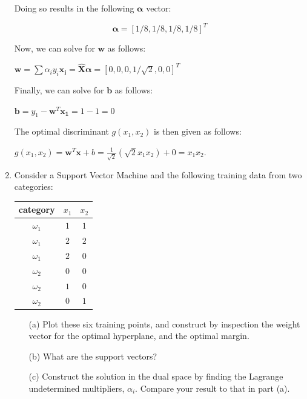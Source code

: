 \documentclass[fleqn]{article}
\begin{document}
\begin{enumerate}
	Doing so results in the following $\boldsymbol{\alpha}$ vector:
	
	\begin{equation*}
		\boldsymbol{\alpha} = [1/8,1/8,1/8,1/8]^T
	\end{equation*}
	
	Now, we can solve for $\mathbf{w}$ as follows:
	
	$\mathbf{w} = \sum{\alpha_iy_i\mathbf{x_i}} = \boldsymbol{\hat{X}}\boldsymbol{\alpha} = [0,0,0,1/\sqrt{2},0,0]^T$
	
	Finally, we can solve for $\mathbf{b}$ as follows:
	
	$\mathbf{b} = y_1 - \mathbf{w}^T\mathbf{x_1} = 1 - 1 = 0$
	
	The optimal discriminant $g(x_1,x_2)$ is then given as follows:
	
	$g(x_1,x_2) = \mathbf{w}^T\mathbf{x} + b = \frac{1}{\sqrt{2}}(\sqrt{2}x_1x_2) + 0 = x_1x_2$.
	
	\item Consider a Support Vector Machine and the following training data from two categories:
	
	\begin{center}
	\begin{tabular}{| c | c | c |}
		\hline
		category & $x_1$ & $x_2$ \\
		\hline
		$\omega_1$ & $1$ & $1$ \\
		$\omega_1$ & $2$ & $2$ \\
		$\omega_1$ & $2$ & $0$ \\
		\hline
		$\omega_2$ & $0$ & $0$ \\
		$\omega_2$ & $1$ & $0$ \\
		$\omega_2$ & $0$ & $1$ \\
		\hline
	\end{tabular}
	\end{center}
	
	\begin{enumerate}
		\item[(a)] Plot these six training points, and construct by inspection the weight vector for the optimal hyperplane, and the optimal margin.
		
		\item[(b)] What are the support vectors?
		
		\item[(c)] Construct the solution in the dual space by finding the Lagrange undetermined multipliers, $\alpha_i$. Compare your result to that in \newline part (a).
	\end{enumerate}
	\end{enumerate}
\end{document}
